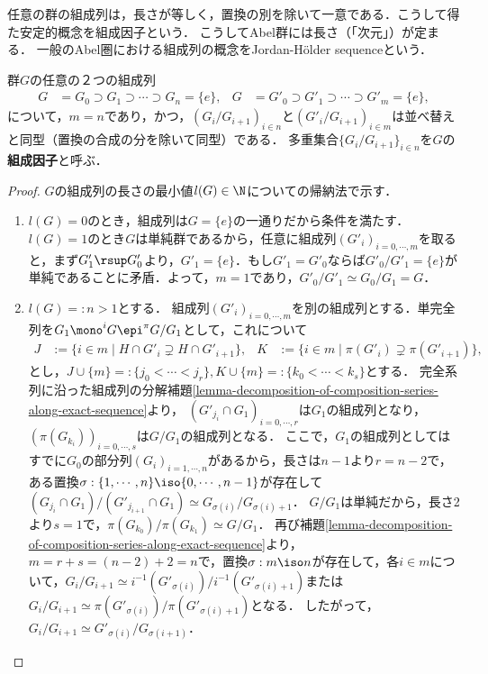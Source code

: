\documentclass[uplatex,dvipdfmx]{jsreport}
\begin{document}
\begin{tcolorbox}[colframe=ForestGreen, colback=ForestGreen!10!white,breakable,colbacktitle=ForestGreen!40!white,coltitle=black,fonttitle=\bfseries\sffamily,
title=More generally a form of the theorem holds in any homological category.]
    任意の群の組成列は，長さが等しく，置換の別を除いて一意である．こうして得た安定的概念を組成因子という．
    こうしてAbel群には長さ（「次元」）が定まる．
    一般のAbel圏における組成列の概念をJordan-Hölder sequenceという．
\end{tcolorbox}

\begin{theorem}\label{thm-Jordan-Hölder}
    群$G$の任意の２つの組成列
    \begin{align*}
        G&=G_0\supset G_1\supset\cdots\supset G_n=\{e\},&G&=G'_0\supset G'_1\supset\cdots\supset G'_m=\{e\},
    \end{align*}
    について，$m=n$であり，かつ，$(G_i/G_{i+1})_{i\in n}$と$(G'_i/G_{i+1})_{i\in m}$は並べ替えと同型（置換の合成の分を除いて同型）である．
    多重集合$\{G_i/G_{i+1}\}_{i\in n}$を$G$の\textbf{組成因子}と呼ぶ．
\end{theorem}
\begin{proof}
    $G$の組成列の長さの最小値$l(G)\in\N$についての帰納法で示す．
    \begin{enumerate}
        \item $l(G)=0$のとき，組成列は$G=\{e\}$の一通りだから条件を満たす．$l(G)=1$のとき$G$は単純群であるから，任意に組成列$(G'_i)_{i=0,\cdots,m}$を取ると，まず$G'_1\rsup G'_0$より，$G'_1=\{e\}$．もし$G'_1=G'_0$ならば$G'_0/G'_1=\{e\}$が単純であることに矛盾．よって，$m=1$であり，$G'_0/G'_1\simeq G_0/G_1=G$．
        \item $l(G)=:n>1$とする．
        組成列$(G'_i)_{i=0,\cdots,m}$を別の組成列とする．単完全列を$G_1\mono^i G\epi^\pi G/G_1$として，これについて
        \begin{align*}
            J&:=\{i\in m\mid H\cap G'_i\supsetneq H\cap G'_{i+1}\},&K&:=\{i\in m\mid \pi(G'_i)\supsetneq\pi(G'_{i+1})\},
        \end{align*}
        とし，$J\cup\{m\}=:\{j_0<\cdots<j_r\},K\cup\{m\}=:\{k_0<\cdots<k_s\}$とする．
        完全系列に沿った組成列の分解補題\ref{lemma-decomposition-of-composition-series-along-exact-sequence}より，
        $(G'_{j_i}\cap G_1)_{i=0,\cdots,r}$は$G_1$の組成列となり，$(\pi(G_{k_i}))_{i=0,\cdots,s}$は$G/G_1$の組成列となる．
        ここで，$G_1$の組成列としてはすでに$G_0$の部分列$(G_i)_{i=1,\cdots,n}$があるから，長さは$n-1$より$r=n-2$で，ある置換$\sigma:\{1,\cdots,n\}\iso\{0,\cdots,n-1\}$が存在して$(G_{j_i}\cap G_1)/(G'_{j_{i+1}}\cap G_1)\simeq G_{\sigma(i)}/G_{\sigma(i)+1}$．
        $G/G_1$は単純だから，長さ2より$s=1$で，$\pi(G_{k_0})/\pi(G_{k_1})\simeq G/G_1$．
        再び補題\ref{lemma-decomposition-of-composition-series-along-exact-sequence}より，$m=r+s=(n-2)+2=n$で，置換$\sigma:m\iso n$が存在して，各$i\in m$について，$G_{i}/G_{i+1}\simeq i^{-1}(G'_{\sigma(i)})/i^{-1}(G'_{\sigma(i)+1})$または$G_{i}/G_{i+1}\simeq \pi(G'_{\sigma(i)})/\pi(G'_{\sigma(i)+1})$となる．
        したがって，$G_i/G_{i+1}\simeq G'_{\sigma(i)}/G_{\sigma(i+1)}$．
    \end{enumerate}
\end{proof}
\end{document}
